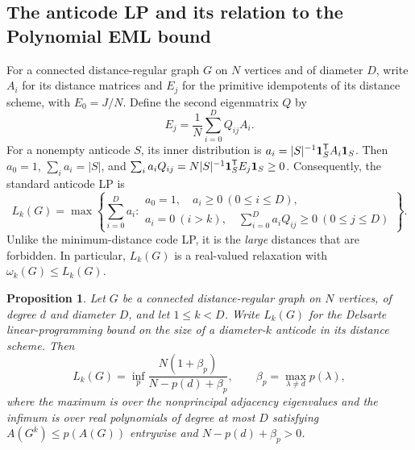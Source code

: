 \documentclass[10pt,a4paper]{article}
\theoremstyle{plain}
\newtheorem{proposition}[theorem]{Proposition}
\numberwithin{equation}{section}
\def\1{\mbox{\boldmath $1$}}
\begin{document}
\subsection{The anticode LP and its relation to the Polynomial EML bound}
For a connected distance-regular graph $G$ on $N$ vertices and of diameter $D$, write $A_i$ for its distance matrices and $E_j$ for the primitive idempotents of its distance scheme, with $E_0=J/N$. Define the second eigenmatrix $Q$ by
\[
 E_j=\frac1N\sum_{i=0}^{D}Q_{ij}A_i.
\]
For a nonempty anticode $S$, its inner distribution is
$a_i=|S|^{-1}\1_S^{\mathsf T}A_i\1_S$. Then $a_0=1$,
$\sum_i a_i=|S|$, and
$\sum_i a_iQ_{ij}=N|S|^{-1}\1_S^{\mathsf T}E_j\1_S\ge0$.
Consequently, the standard anticode LP is~\cite{Delsarte_1973,Tanaka_2012}
\begin{equation}\label{eq:coding-primal}
 L_k(G)=\max\left\{\sum_{i=0}^{D}a_i:
 \begin{array}{l}
 a_0=1,\quad a_i\ge0\ (0\le i\le D),\\
 a_i=0\ (i>k),\quad
 \sum_{i=0}^{D}a_iQ_{ij}\ge0\ (0\le j\le D)
 \end{array}\right\}.
\end{equation}
Unlike the minimum-distance code LP, it is the \emph{large} distances that are forbidden. In particular, $L_k(G)$ is a real-valued relaxation with $\omega_k(G)\le L_k(G)$.%

\begin{proposition}\label{prop:coding-delsarte}
Let $G$ be a connected distance-regular graph on $N$ vertices, of degree $d$ and diameter $D$, and let $1\le k<D$. Write $L_k(G)$ for the Delsarte linear-programming bound on the size of a diameter-$k$ anticode in its distance scheme. Then
\begin{equation}\label{eq:coding-delsarte}
 L_k(G)=\inf_p
 \frac{N(1+\beta_p)}{N-p(d)+\beta_p},
 \qquad
 \beta_p=\max_{\lambda\ne d}p(\lambda),
\end{equation}
where the maximum is over the nonprincipal adjacency eigenvalues and the infimum is over real polynomials of degree at most $D$ satisfying
$A(G^k)\le p(A(G))$ entrywise and $N-p(d)+\beta_p>0$.
\end{proposition}
\end{document}
